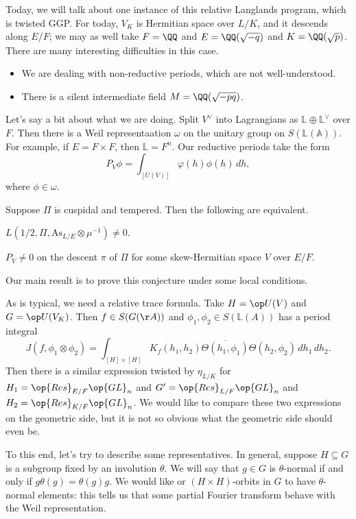 \documentclass{article}
\begin{document}
Today, we will talk about one instance of this relative Langlands program, which is twisted GGP. For today, $V_K$ is Hermitian space over $L/K$, and it descends along $E/F$; we may as well take $F=\QQ$ and $E=\QQ(\sqrt{-q})$ and $K=\QQ(\sqrt p)$. There are many interesting difficulties in this case.
\begin{itemize}
	\item We are dealing with non-reductive periods, which are not well-understood.
	\item There is a silent intermediate field $M=\QQ(\sqrt{-pq})$.
\end{itemize}
Let's say a bit about what we are doing. Split $V^\lor$ into Lagrangians as $\mathbb L\oplus\mathbb L^\lor$ over $F$. Then there is a Weil representaation $\omega$ on the unitary group on $S(\mathbb L(\mathbb A))$. For example, if $E=F\times F$, then $\mathbb L=F^n$. Our reductive periods take the form
\[P_V\phi=\int_{[U(V)]}\varphi(h)\phi(h)\,dh,\]
where $\phi\in\omega$.
\begin{conj}
	Suppose $\Pi$ is cuspidal and tempered. Then the following are equivalent.
	\begin{listalph}
		\item $L(1/2,\Pi,\mathrm{As}_{L/E}\otimes\mu^{-1})\ne0$.
		\item $P_V\ne0$ on the descent $\pi$ of $\Pi$ for some skew-Hermitian space $V$ over $E/F$.
	\end{listalph}
\end{conj}
Our main result is to prove this conjecture under some local conditions.

As is typical, we need a relative trace formula. Take $H=\op U(V)$ and $G=\op U(V_K)$. Then $f\in S(G(\AA))$ and $\phi_1,\phi_2\in S(\mathbb L(A))$ has a period integral
\[J(f,\phi_1\otimes\phi_2)=\int_{[H]\times[H]}K_f(h_1,h_2)\overline{\Theta(h_1,\phi_1)}\Theta(h_2,\phi_2)\,dh_1\,dh_2.\]
Then there is a similar expression twisted by $\eta_{L/K}$ for $H_1=\op{Res}_{E/F}\op{GL}_n$ and $G'=\op{Res}_{L/F}\op{GL}_n$ and $H_2=\op{Res}_{K/F}\op{GL}_n$. We would like to compare these two expressions on the geometric side, but it is not so obvious what the geometric side should even be.

To this end, let's try to describe some representatives. In general, suppose $H\subseteq G$ is a subgroup fixed by an involution $\theta$. We will say that $g\in G$ is $\theta$-normal if and only if $g\theta(g)=\theta(g)g$. We would like or $(H\times H)$-orbits in $G$ to have $\theta$-normal elements: this tells us that some partial Fourier transform behave with the Weil representation.
\end{document}
